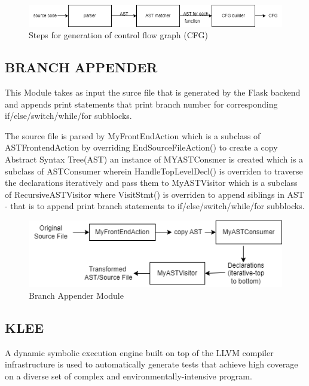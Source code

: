 \begin{figure}[h]
\centering
\includegraphics[width=1\textwidth]{3/ast.png}
\caption{Steps for generation of control flow graph (CFG)}
\label{fig:ast}
\end{figure}

\subsection{BRANCH APPENDER}
This Module takes as input the surce file that is generated by the Flask backend and appends print statements that print branch number for corresponding if/else/switch/while/for subblocks.

The source file is parsed by MyFrontEndAction which is a subclass of ASTFrontendAction by overriding  EndSourceFileAction() to create a copy Abstract Syntax Tree(AST) an instance of MYASTConsmer is created which is a subclass of ASTConsumer wherein HandleTopLevelDecl() is overriden to traverse the declarations iteratively and pass them to MyASTVisitor which is a subclass of RecursiveASTVisitor where VisitStmt() is overriden to append siblings in AST - 
 that is to append print branch statements to  if/else/switch/while/for subblocks.

\begin{figure}[h]
\centering
\includegraphics[width=1\textwidth]{3/branchappender.png}
\caption{Branch Appender Module}
\label{fig:graph_compare}
\end{figure}










\subsection{KLEE}
  
A dynamic symbolic execution engine built on top of the LLVM compiler infrastructure is used to automatically generate tests that achieve high coverage on a diverse set of complex and environmentally-intensive program.
  
